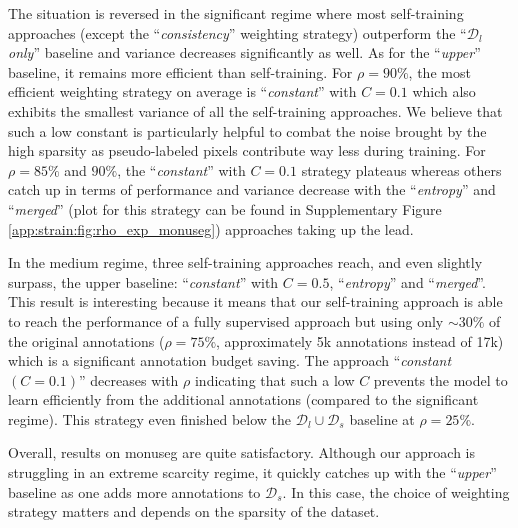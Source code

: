 The situation is reversed in the significant regime where most self-training approaches (except the ``\textit{consistency}'' weighting strategy) outperform the ``\textit{$\mathcal{D}_l$ only}'' baseline and variance decreases significantly as well. As for the ``\textit{upper}'' baseline, it remains more efficient than self-training. For $\rho = 90\%$, the most efficient weighting strategy on average is ``\textit{constant}'' with $C = 0.1$ which also exhibits the smallest variance of all the self-training approaches. We believe that such a low constant is particularly helpful to combat the noise brought by the high sparsity as pseudo-labeled pixels contribute way less during training. For $\rho = 85\%$ and $90\%$, the ``\textit{constant}'' with $C = 0.1$ strategy plateaus whereas others catch up in terms of performance and variance decrease with the ``\textit{entropy}'' and ``\textit{merged}'' (plot for this strategy can be found in Supplementary Figure \ref{app:strain:fig:rho_exp_monuseg}) approaches taking up the lead.

In the medium regime, three self-training approaches reach, and even slightly surpass, the upper baseline: ``\textit{constant}'' with $C = 0.5$, ``\textit{entropy}'' and ``\textit{merged}''. This result is interesting because it means that our self-training approach is able to reach the performance of a fully supervised approach but using only $\sim 30\%$ of the original annotations (\ie $\rho = 75\%$, approximately 5k annotations instead of 17k) which is a significant annotation budget saving. The approach ``\textit{constant} $(C=0.1)$'' decreases with $\rho$ indicating that such a low $C$ prevents the model to learn efficiently from the additional annotations (compared to the significant regime). This strategy even finished below the $\mathcal{D}_l \cup \mathcal{D}_s$ baseline at $\rho = 25\%$. 

Overall, results on \acrshort{monuseg}  are quite satisfactory. Although our approach is struggling in an extreme scarcity regime, it quickly catches up with the ``\textit{upper}'' baseline as one adds more annotations to $\mathcal{D}_s$. In this case, the choice of weighting strategy matters and depends on the sparsity of the dataset.

